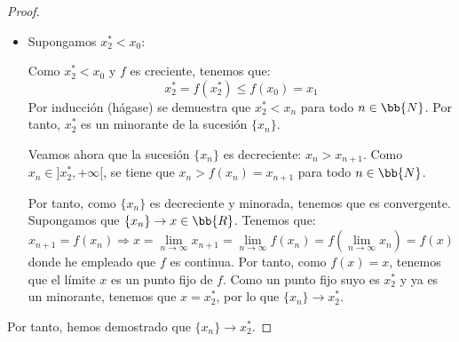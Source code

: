 \begin{ejemplo}[Genérico]
\begin{proof}
\begin{itemize}
        \item Supongamos $x_2^\ast<x_0$:

        Como $x_2^\ast<x_0$ y $f$ es creciente, tenemos que:
        \begin{equation*}
            x_2^\ast=f(x_2^\ast) \leq f(x_0)=x_1
        \end{equation*}
        Por inducción (hágase) se demuestra que $x_2^\ast < x_n$ para todo $n\in \bb{N}$. Por tanto, $x_2^\ast$ es un minorante de la sucesión $\{x_n\}$.
        
        Veamos ahora que la sucesión $\{x_n\}$ es decreciente: $x_n > x_{n+1}$. Como $x_n \in ]x_2^\ast, +\infty[$, se tiene que
        $x_n > f(x_n) = x_{n+1}$ para todo $n\in \bb{N}$.

        Por tanto, como $\{x_n\}$ es decreciente y minorada, tenemos que es convergente. Supongamos que $\{x_n\}\to x\in \bb{R}$. Tenemos que:
        \begin{equation*}
            x_{n+1} = f(x_n)
            \Longrightarrow
            x = \lim_{n\to \infty} x_{n+1} 
            = \lim_{n\to \infty}
            f(x_n) = f\left(\lim_{n\to \infty}x_n\right) = f(x)
        \end{equation*}
        donde he empleado que $f$ es continua. Por tanto, como $f(x)=x$, tenemos que el límite $x$ es un punto fijo de $f$. Como un punto fijo suyo es $x_2^\ast$ y ya es un minorante, tenemos que $x=x_2^\ast$, por lo que $\{x_n\}\to x_2^\ast$.
    \end{itemize}

    Por tanto, hemos demostrado que $\{x_n\}\to x_2^\ast$.
    \end{proof}
\end{ejemplo}~\\

